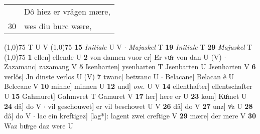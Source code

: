 \documentclass[8pt,a4paper,notitlepage]{article}
\begin{document}
\begin{table}[ht]
\begin{minipage}[t]{0.5\linewidth}
\begin{tabular}{rl}
 & Dô hiez er vrâgen mære,\\ 
30 & wes diu burc wære,\\ 
\end{tabular}
\scriptsize
\line(1,0){75} \newline
T U V \newline
\line(1,0){75} \newline
\textbf{15} \textit{Initiale} U V   $\cdot$ \textit{Majuskel} T  \textbf{19} \textit{Initiale} T  \textbf{29} \textit{Majuskel} T  \newline
\line(1,0){75} \newline
\textbf{1} ellen] ellende U \textbf{2} von dannen vuor er] Er vuͦr von dan U (V)  $\cdot$ Zazamanc] zazamang V \textbf{5} Isenharten] ysenharten T Jsenbarten U Jsenharten V \textbf{6} verlôs] Jn dinste verlos U (V) \textbf{7} twanc] betwanc U  $\cdot$ Belacane] Belacan ê U Belecane V \textbf{10} minne] minnen U \textbf{12} und] \textit{om.} U V \textbf{14} ellenthafter] ellentschafter U \textbf{15} Gahmuret] Gahmvret T Gamuret V \textbf{17} her] here er U \textbf{23} kom] Kuͦmet U \textbf{24} dâ] do V  $\cdot$ vil geschouwet] er vil beschowet U V \textbf{26} dâ] do V \textbf{27} unz] vͦz U \textbf{28} dâ] do V  $\cdot$ lac ein kreftigez] [lag*]: lagent zwei creftige V \textbf{29} mære] der mere V \textbf{30} Waz buͦrge daz were U \newline
\end{minipage}
\end{table}
\end{document}
